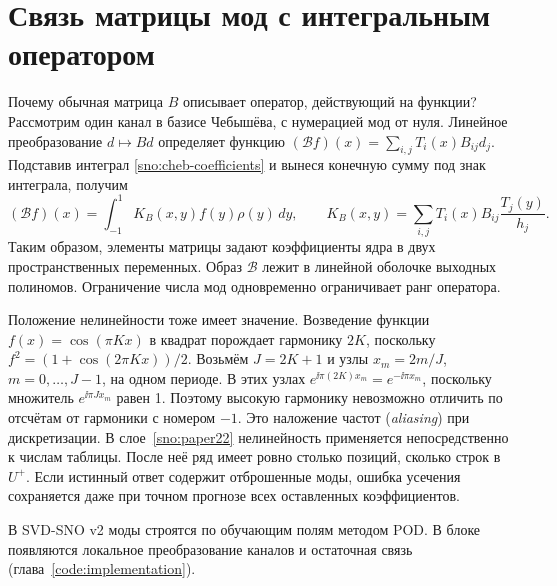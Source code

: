 \section{Связь матрицы мод с интегральным оператором}

Почему обычная матрица $B$ описывает оператор, действующий на функции?
Рассмотрим один канал в базисе Чебышёва, с нумерацией мод от нуля.
Линейное преобразование $d\mapsto Bd$ определяет функцию
$(\mathcal B f)(x)=\sum_{i,j} T_i(x)B_{ij}d_j$.
Подставив интеграл \eqref{sno:cheb-coefficients} и вынеся конечную
сумму под знак интеграла, получим
\begin{equation}
 (\mathcal B f)(x)=\int_{-1}^1 K_B(x,y)f(y)\rho(y)\,dy,
 \qquad
 K_B(x,y)=\sum_{i,j} T_i(x)B_{ij}\frac{T_j(y)}{h_j}.
 \label{sno:kernel}
\end{equation}
Таким образом, элементы матрицы задают коэффициенты ядра в двух
пространственных переменных. Образ $\mathcal B$ лежит в линейной
оболочке выходных полиномов. Ограничение числа мод одновременно
ограничивает ранг оператора.

Положение нелинейности тоже имеет значение. Возведение функции
$f(x)=\cos(\pi Kx)$ в квадрат порождает гармонику $2K$, поскольку
$f^2=(1+\cos(2\pi Kx))/2$. Возьмём $J=2K+1$ и узлы $x_m=2m/J$,
$m=0,\ldots,J-1$, на одном периоде. В этих узлах
$e^{\ii\pi(2K)x_m}=e^{-\ii\pi x_m}$, поскольку множитель
$e^{\ii \pi J x_m}$ равен 1. Поэтому высокую гармонику невозможно
отличить по отсчётам от гармоники с номером $-1$. Это наложение
частот (\emph{aliasing}) при дискретизации. В слое~\eqref{sno:paper22}
нелинейность применяется непосредственно к числам таблицы. После
неё ряд имеет ровно столько позиций, сколько строк в $U^+$.
Если истинный ответ содержит отброшенные моды, ошибка усечения
сохраняется даже при точном прогнозе всех оставленных коэффициентов.

В SVD-SNO v2 моды строятся по обучающим полям методом POD.
В блоке появляются локальное преобразование каналов и остаточная
связь (глава~\ref{code:implementation}).
